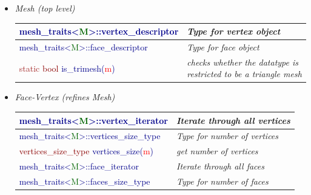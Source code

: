 \documentclass{article}
\begin{document}
\begin{itemize}

\item \emph{Mesh (top level)}

\begin{table}[0.8\textwidth]
\begin{tabular}{| p{} | p{} |}
\hline
\textsf{\textcolor{darkblue}{mesh\_traits\textless}\textcolor{darkgreen}{M}\textcolor{darkblue}{\textgreater ::vertex\_descriptor}}  &
\emph{Type for vertex object}\\ \hline

\textsf{\textcolor{darkblue}{mesh\_traits\textless}\textcolor{darkgreen}{M}\textcolor{darkblue}{\textgreater ::face\_descriptor}} & \emph{Type for face object}\\ \hline
\textsf{\textcolor{brown}{static} \textcolor{darkred}{bool}} \textsf{\textcolor{darkblue}{is\_trimesh(\textcolor{red}{m})}} &  \emph{checks whether the datatype is restricted to be a triangle mesh}\\ \hline
\end{tabular}
\end{table}

\item \emph{Face-Vertex (refines Mesh)}
\begin{table}[0.8\textwidth]
\begin{tabular}{|p{} | p{} |} 

\hline
\textsf{\textcolor{darkblue}{mesh\_traits\textless}\textcolor{darkgreen}{M}\textcolor{darkblue}{\textgreater ::vertex\_iterator}} & \emph{Iterate through all vertices}\\ \hline

\textsf{\textcolor{darkblue}{mesh\_traits\textless}\textcolor{darkgreen}{M}\textcolor{darkblue}{\textgreater ::vertices\_size\_type}} & \emph{Type for number of vertices}\\ \hline

\textsf{\textcolor{darkred}{vertices\_size\_type}} \textsf{\textcolor{darkblue}{vertices\_size(\textcolor{red}{m})}} & \emph{get number of vertices}\\ \hline

\textsf{\textcolor{darkblue}{mesh\_traits\textless\textcolor{darkgreen}{M}\textgreater ::face\_iterator}} & \emph{Iterate through all faces}\\ \hline

\textsf{\textcolor{darkblue}{mesh\_traits\textless\textcolor{darkgreen}{M}\textgreater ::faces\_size\_type}} & \emph{Type for number of faces}\\ \hline


\end{tabular}
\end{table}
\end{itemize}
\end{document}
